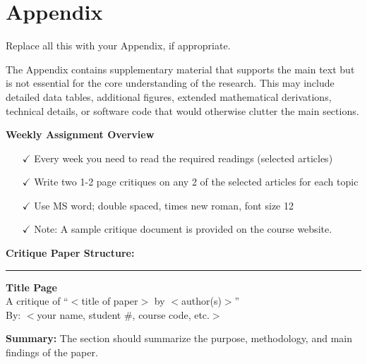 \section*{Appendix}
\label{Appendix}

Replace all this with your Appendix, if appropriate.

The Appendix contains supplementary material that supports the main text but is not essential for the core understanding of the research. This may include detailed data tables, additional figures, extended mathematical derivations, technical details, or software code that would otherwise clutter the main sections. 



\begin{center}
	\textbf{Weekly Assignment Overview }
\end{center}

\begin{itemize}
	\item[$\checkmark$] Every week you need to read the required readings (selected articles)
	\item[$\checkmark$] Write two 1-2 page critiques on any 2 of the selected articles for each topic
	\item[$\checkmark$] Use MS word; double spaced, times new roman, font size 12
	\item[$\checkmark$] Note:  A sample critique document is provided on the course website. 
\end{itemize}


\textbf{Critique Paper Structure:}

\par\noindent\rule{8.9cm}{0.4pt}

\begin{center}
	\textbf{Title Page}
	\\[5pt]
	A critique of ``$<$title of paper$>$ by $<$author(s)$>$''
	\\[5pt]
	By:  $<$your name, student $\#$, course code, etc.$>$
	\\[1pt]
\end{center}

\hfill \break
\textbf{Summary:}
The section should summarize the purpose, methodology, and main findings of the paper.

